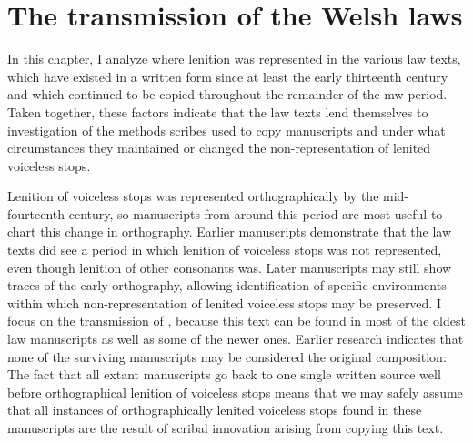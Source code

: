 \chapter{The transmission of the Welsh laws}
\label{cha:welsh-laws}

In this chapter, I analyze where lenition was represented in the various law texts, which have existed in a written form since at least the early thirteenth century and which continued to be copied throughout the remainder of the \gls{mw} period. Taken together, these factors indicate that the law texts lend themselves to investigation of the methods  scribes used to copy manuscripts and under what circumstances they maintained or changed the non-representation of lenited voiceless stops.

Lenition of voiceless stops was represented orthographically by the mid-fourteenth century, so manuscripts from around this period are most useful to chart this change in orthography.
Earlier manuscripts  demonstrate that the law texts did see a period in which lenition of voiceless stops was not represented, even though lenition of other consonants was.
Later manuscripts may still show traces of the early orthography, allowing identification of specific environments within which non-representation of lenited voiceless stops may be preserved.
I focus on the transmission of , because this text can be found in most of the oldest law manuscripts as well as some of the newer ones. Earlier research indicates that none of the surviving manuscripts may be considered the original composition:
The fact that all extant manuscripts go back to one single written source well before orthographical lenition of voiceless stops means that we may safely assume that all instances of orthographically lenited voiceless stops found in these manuscripts are the result of scribal innovation arising from copying this text. 


